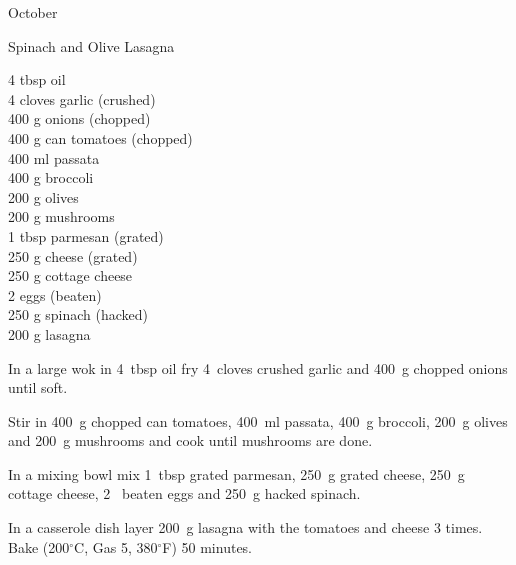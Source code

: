 \begin{menu}{October}
    \begin{recipe}{2}{Spinach and Olive Lasagna}%
		\begin{ingredients}
		4 tbsp oil  \\
	4 cloves garlic (crushed) \\
	400 g onions (chopped) \\
	400 g can tomatoes (chopped) \\
	400 ml passata  \\
	400 g broccoli  \\
	200 g olives  \\
	200 g mushrooms  \\
	1 tbsp parmesan (grated) \\
	250 g cheese (grated) \\
	250 g cottage cheese  \\
	2  eggs (beaten) \\
	250 g spinach (hacked) \\
	200 g lasagna  \\
	
		\end{ingredients}
	
	
    \begin{instructions}
    \item 
        In a large wok in
        4~tbsp  oil
        fry
        4~cloves crushed garlic
        and
        400~g chopped onions
        until soft.
      \item 
        Stir in
        400~g chopped can tomatoes,
        400~ml  passata,
        400~g  broccoli,
        200~g  olives
        and
        200~g  mushrooms
        and cook until mushrooms are done.
      \item 
        In a mixing bowl mix
        1~tbsp grated parmesan,
        250~g grated cheese,
        250~g  cottage cheese,
        2~ beaten eggs
        and
        250~g hacked spinach.
      \item 
        In a casserole dish layer
        200~g  lasagna
        with the tomatoes and cheese 3 times.
        Bake (200$^{\circ}$C, Gas 5, 380$^{\circ}$F) 50 minutes.
      
    \end{instructions}
    \end{recipe}%
  

\end{menu}
